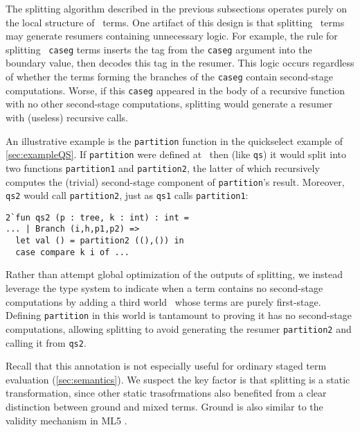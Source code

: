 \begin{abstrsyn}
The splitting algorithm described in the previous subsections operates
purely on the local structure of \lang\ terms.  One artifact of this design
is that splitting \bbonem\ terms may generate resumers containing
unnecessary logic.  For example, the rule for splitting
\bbonem\ \texttt{caseg} terms inserts the tag from the \texttt{caseg}
argument into the boundary value, then decodes this tag in the
resumer. This logic occurs regardless of whether the terms forming the
branches of the \texttt{caseg} contain second-stage computations.
Worse, if this \texttt{caseg} appeared in the body of a recursive
function with no other second-stage computations, splitting would
generate a resumer with (useless) recursive calls.

An illustrative example is the \texttt{partition} function in the quickselect
example of \ref{sec:exampleQS}. If \texttt{partition} were defined at \bbonem\
then (like \texttt{qs}) it would split into two functions
\texttt{partition1} and \texttt{partition2}, the latter of which recursively
computes the (trivial) second-stage component of \texttt{partition}'s result.
Moreover, \texttt{qs2} would call \texttt{partition2}, just as \texttt{qs1}
calls \texttt{partition1}:
\begin{lstlisting}
2`fun qs2 (p : tree, k : int) : int =
... | Branch (i,h,p1,p2) =>
  let val () = partition2 ((),()) in
  case compare k i of ...
\end{lstlisting}

Rather than attempt global optimization of the outputs of splitting,
we instead leverage the type system to indicate when a term contains
no second-stage computations by adding a third world \bbonep\ whose
terms are purely first-stage.  
Defining \texttt{partition} in this world is 
tantamount to proving it has no second-stage computations,
allowing splitting to avoid generating the resumer \texttt{partition2}
and calling it from \texttt{qs2}.

Recall that this annotation is not especially useful 
for ordinary staged term evaluation (\ref{sec:semantics}).
We suspect the key factor is that splitting is a static transformation,
since other static trasofrmations \cite{Mogensen89a,DeNiel91} 
also benefited from a clear distinction between ground and mixed terms.
Ground is also similar to the validity mechanism in ML5 \cite{murphy05}.
\end{abstrsyn}



